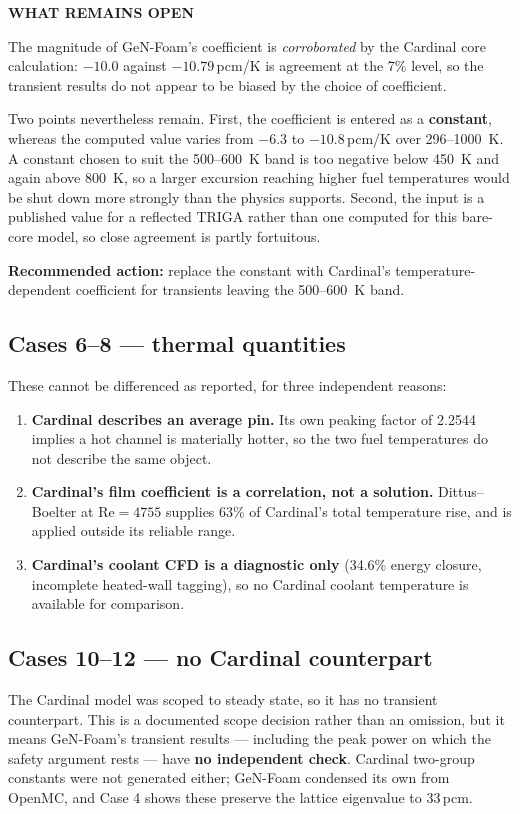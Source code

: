 \documentclass[11pt,a4paper]{article}
\newcommand{\pcm}{\,pcm}
\newenvironment{callout}[2][warnbg]
 {\edef\calloutcolor{#1}\def\callouttitle{#2}%
  \begin{lrbox}{\calloutbox}%
  \begin{minipage}{\dimexpr\textwidth-2\fboxsep\relax}%
  \vspace{1mm}\par\textbf{\footnotesize\MakeUppercase{\callouttitle}}\par\vspace{1mm}\small}
 {\vspace{1mm}\end{minipage}\end{lrbox}%
  \par\vspace{2mm}\noindent\colorbox{\calloutcolor}{\usebox{\calloutbox}}\par\vspace{2mm}}
\begin{document}
\begin{callout}{What remains open}
The magnitude of GeN-Foam's coefficient is \emph{corroborated} by the Cardinal core
calculation: $-10.0$ against $-10.79$\,pcm/K is agreement at the 7\% level, so the transient
results do not appear to be biased by the choice of coefficient.

Two points nevertheless remain. First, the coefficient is entered as a \textbf{constant},
whereas the computed value varies from $-6.3$ to $-10.8$\,pcm/K over
296--\SI{1000}{\kelvin}. A constant chosen to suit the 500--\SI{600}{\kelvin} band is too
negative below \SI{450}{\kelvin} and again above \SI{800}{\kelvin}, so a larger excursion
reaching higher fuel temperatures would be shut down more strongly than the physics supports.
Second, the input is a published value for a reflected TRIGA rather than one computed for
this bare-core model, so close agreement is partly fortuitous.

\textbf{Recommended action:} replace the constant with Cardinal's temperature-dependent
coefficient for transients leaving the 500--\SI{600}{\kelvin} band.
\end{callout}

\subsection{Cases 6--8 --- thermal quantities}
These cannot be differenced as reported, for three independent reasons:
\begin{enumerate}\itemsep2pt
\item \textbf{Cardinal describes an average pin.} Its own peaking factor of 2.2544 implies a hot
channel is materially hotter, so the two fuel temperatures do not describe the same object.
\item \textbf{Cardinal's film coefficient is a correlation, not a solution.} Dittus--Boelter at
$\mathrm{Re}=4755$ supplies 63\% of Cardinal's total temperature rise, and is applied outside its
reliable range.
\item \textbf{Cardinal's coolant CFD is a diagnostic only} (34.6\% energy closure, incomplete
heated-wall tagging), so no Cardinal coolant temperature is available for comparison.
\end{enumerate}

\subsection{Cases 10--12 --- no Cardinal counterpart}
The Cardinal model was scoped to steady state, so it has no transient counterpart. This is a
documented scope decision rather than an omission, but it means GeN-Foam's transient results
--- including the peak power on which the safety argument rests --- have \textbf{no independent
check}. Cardinal two-group constants were not generated either; GeN-Foam condensed its own
from OpenMC, and Case 4 shows these preserve the lattice eigenvalue to 33\pcm{}.
\end{document}
